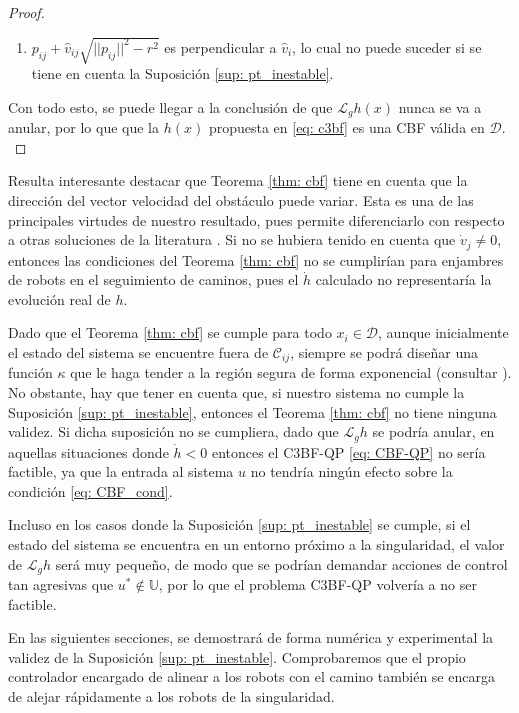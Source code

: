 \begin{proof}
\begin{enumerate}
    \item $p_{ij} + \hat v_{ij} \sqrt{||p_{ij}||^2 - r^2}$ es perpendicular a $\hat v_i$, lo cual no puede suceder si se tiene en cuenta la Suposición \ref{sup: pt_inestable}. 
\end{enumerate}

Con todo esto, se puede llegar a la conclusión de que $\mathcal{L}_g h(x)$ nunca se va a anular, por lo que que la $h(x)$ propuesta en \eqref{eq: c3bf} es una CBF válida en $\mathcal{D}$.\\
\end{proof}

\vspace{0.2cm}

Resulta interesante destacar que Teorema \ref{thm: cbf} tiene en cuenta que la dirección del vector velocidad del obstáculo puede variar. Esta es una de las principales virtudes de nuestro resultado, pues permite diferenciarlo con respecto a otras soluciones de la literatura \cite{c3bf_car, c3bf_UAV}. Si no se hubiera tenido en cuenta que $\dot v_j \neq 0$, entonces las condiciones del Teorema \ref{thm: cbf} no se cumplirían para enjambres de robots en el seguimiento de caminos, pues el $\dot h$ calculado no representaría la evolución real de $h$.

Dado que el Teorema \ref{thm: cbf} se cumple para todo $x_i \in \mathcal{D}$, aunque inicialmente el estado del sistema se encuentre fuera de $\mathcal{C}_{ij}$, siempre se podrá diseñar una función $\kappa$ que le haga tender a la región segura de forma exponencial (consultar \cite{c3bf_car}). No obstante, hay que tener en cuenta que, si nuestro sistema no cumple la Suposición \ref{sup: pt_inestable}, entonces el Teorema \ref{thm: cbf} no tiene ninguna validez. Si dicha suposición no se cumpliera, dado que $\mathcal{L}_g h$ se podría anular, en aquellas situaciones donde $\dot h < 0$ entonces el C3BF-QP \eqref{eq: CBF-QP} no sería factible, ya que la entrada al sistema $u$ no tendría ningún efecto sobre la condición \eqref{eq: CBF_cond}. 
  
Incluso en los casos donde la Suposición \ref{sup: pt_inestable} se cumple, si el estado del sistema se encuentra en un entorno próximo a la singularidad, el valor de $\mathcal{L}_g h$ será muy pequeño, de modo que se podrían demandar acciones de control tan agresivas que $u^* \notin \mathds{U}$, por lo que el problema C3BF-QP volvería a no ser factible. 

En las siguientes secciones, se demostrará de forma numérica y experimental la validez de la Suposición \ref{sup: pt_inestable}. Comprobaremos que el propio controlador encargado de alinear a los robots con el camino también se encarga de alejar rápidamente a los robots de la singularidad. 

